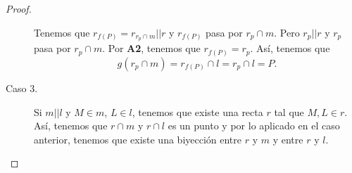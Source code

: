 \begin{proof}
\begin{description}
\[\]
Tenemos que $\displaystyle r_{f\left(P\right)} = r _{r_{p} \cap m} | | r $ y $\displaystyle r_{f\left(P\right)} $ pasa por $\displaystyle r_{p} \cap m $. Pero $\displaystyle r_{p} | | r $ y $\displaystyle r_{p} $ pasa por $\displaystyle r_{p} \cap m $. Por \textbf{A2}, tenemos que $\displaystyle r_{f\left(P\right)} = r_{p} $. Así, tenemos que
\[g\left(r_{p} \cap m\right) = r_{f\left(P\right)} \cap l = r_{p} \cap l = P .\]
\item[Caso 3.] Si $\displaystyle m | | l $ y $\displaystyle M \in m $, $\displaystyle L \in l $, tenemos que existe una recta $\displaystyle r $ tal que $\displaystyle M, L \in r $. Así, tenemos que $\displaystyle r \cap m $ y $\displaystyle r \cap l $ es un punto y por lo aplicado en el caso anterior, tenemos que existe una biyección entre $\displaystyle r $ y $\displaystyle m $ y entre $\displaystyle r $ y $\displaystyle l $.
\end{description}
\end{proof}

